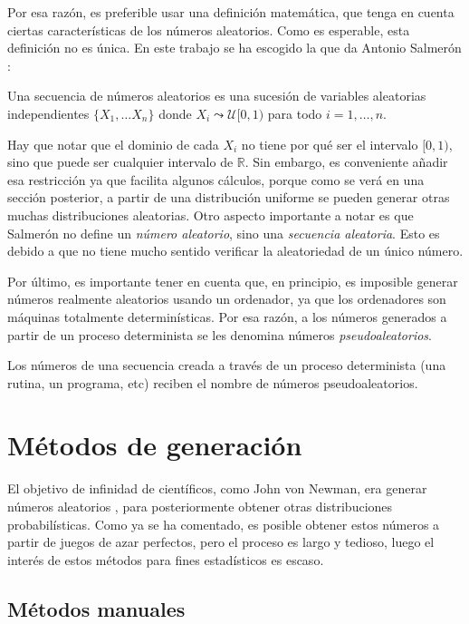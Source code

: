 Por esa razón, es preferible usar una definición matemática, que tenga en cuenta ciertas características de los números aleatorios. Como es esperable, esta definición no es única. En este trabajo se ha escogido la que da Antonio Salmerón \cite{SalmeronMorales}:
\begin{definition}\label{def:randomnumber}
Una secuencia de números aleatorios es una sucesión de variables aleatorias independientes $\{X_1,\ldots X_n\}$ donde $X_i\leadsto\mathcal{U}[0,1)$ para todo $i=1,\ldots,n$.
\end{definition}
Hay que notar que el dominio de cada $X_i$ no tiene por qué ser el intervalo $[0,1)$, sino que puede ser cualquier intervalo de $\mathbb{R}$. Sin embargo, es conveniente añadir esa restricción ya que facilita algunos cálculos, porque como se verá en una sección posterior, a partir de una distribución uniforme se pueden generar otras muchas distribuciones aleatorias. Otro aspecto importante a notar es que Salmerón no define un \textit{número aleatorio}, sino una \textit{secuencia aleatoria}. Esto es debido a que no tiene mucho sentido verificar la aleatoriedad de un único número.

Por último, es importante tener en cuenta que, en principio, es imposible generar números realmente aleatorios usando un ordenador, ya que los ordenadores son máquinas totalmente determinísticas. Por esa razón, a los números generados a partir de un proceso determinista se les denomina números \textit{pseudoaleatorios}. 

\begin{definition}
Los números de una secuencia creada a través de un proceso determinista (una rutina, un programa, etc) reciben el nombre de números pseudoaleatorios.
\end{definition}

\section{Métodos de generación}

El objetivo de infinidad de científicos, como John von Newman, era generar números aleatorios \cite{metropolisbeginning}, para posteriormente  obtener otras distribuciones probabilísticas. Como ya se ha comentado, es posible obtener estos números a partir de juegos de azar perfectos, pero el proceso es largo y tedioso, luego el interés de estos métodos para fines estadísticos es escaso.

\subsection{Métodos manuales}

